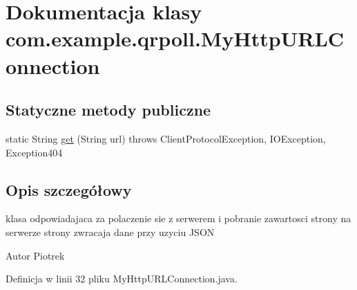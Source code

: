 \hypertarget{classcom_1_1example_1_1qrpoll_1_1_my_http_u_r_l_connection}{\section{Dokumentacja klasy com.\+example.\+qrpoll.\+My\+Http\+U\+R\+L\+Connection}
\label{classcom_1_1example_1_1qrpoll_1_1_my_http_u_r_l_connection}
}
\subsection*{Statyczne metody publiczne}
\begin{DoxyCompactItemize}
\item 
static String \hyperlink{classcom_1_1example_1_1qrpoll_1_1_my_http_u_r_l_connection_a2da0c692c90b6a847356d6573c288acc}{get} (String url)  throws Client\+Protocol\+Exception, I\+O\+Exception, Exception404
\end{DoxyCompactItemize}


\subsection{Opis szczegółowy}
klasa odpowiadajaca za polaczenie sie z serwerem i pobranie zawartosci strony na serwerze strony zwracaja dane przy uzyciu J\+S\+O\+N \begin{DoxyAuthor}{Autor}
Piotrek 
\end{DoxyAuthor}


Definicja w linii 32 pliku My\+Http\+U\+R\+L\+Connection.\+java.




